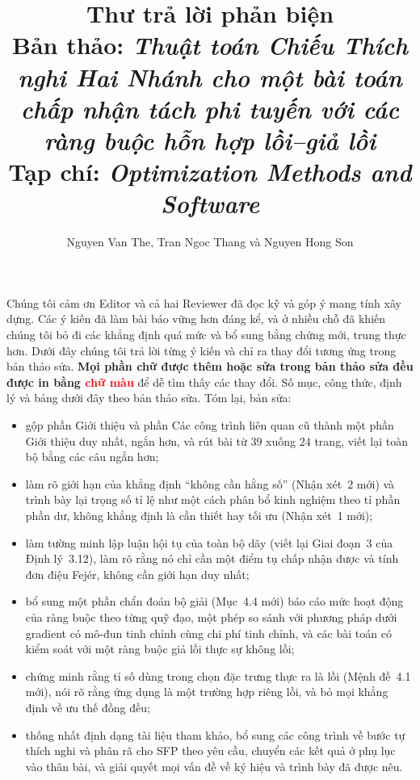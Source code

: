 \documentclass[11pt]{article}
\title{\vspace{-2em}Thư trả lời phản biện\\[0.3em]
\large Bản thảo: \emph{Thuật toán Chiếu Thích nghi Hai Nhánh cho một bài toán chấp nhận tách phi tuyến với các ràng buộc hỗn hợp lồi--giả lồi}\\[0.2em]
\normalsize Tạp chí: \emph{Optimization Methods and Software}}
\author{Nguyen Van The, Tran Ngoc Thang và Nguyen Hong Son}
\date{}
\begin{document}
\maketitle
\vspace{-2em}

\begin{center}
\end{center}

\noindent Chúng tôi cảm ơn Editor và cả hai Reviewer đã đọc kỹ và góp ý mang tính xây dựng.
Các ý kiến đã làm bài báo vững hơn đáng kể, và ở nhiều chỗ đã khiến
chúng tôi bỏ đi các khẳng định quá mức và bổ sung bằng chứng mới, trung thực hơn. Dưới đây chúng tôi trả lời
từng ý kiến và chỉ ra thay đổi tương ứng trong bản thảo sửa.
\textbf{Mọi phần chữ được thêm hoặc sửa trong bản thảo sửa đều được in bằng
\textcolor{red}{chữ màu}} để dễ tìm thấy các thay đổi. Số mục, công thức,
định lý và bảng dưới đây theo bản thảo sửa. Tóm lại, bản sửa:
\begin{itemize}[nosep]
  \item gộp phần Giới thiệu và phần Các công trình liên quan cũ thành một phần Giới thiệu
        duy nhất, ngắn hơn, và rút bài từ $39$ xuống $24$ trang, viết lại toàn bộ
        bằng các câu ngắn hơn;
  \item làm rõ giới hạn của khẳng định ``không cần hằng số'' (Nhận xét~2 mới) và trình bày lại trọng số tỉ lệ
        như một cách phân bổ kinh nghiệm theo tỉ phần phần dư, không khẳng định là cần thiết hay
        tối ưu (Nhận xét~1 mới);
  \item làm tường minh lập luận hội tụ của toàn bộ dãy (viết lại Giai đoạn~3 của
        Định lý~3.12), làm rõ rằng nó chỉ cần một điểm tụ chấp nhận được và
        tính đơn điệu Fej\'er, không cần giới hạn duy nhất;
  \item bổ sung một phần chẩn đoán bộ giải (Mục~4.4 mới) báo cáo mức hoạt động của ràng buộc
        theo từng quỹ đạo, một phép so sánh với phương pháp dưới gradient có mô-đun tinh chỉnh cùng chi phí tinh chỉnh, và
        các bài toán có kiểm soát với một ràng buộc giả lồi thực sự không lồi;
  \item chứng minh rằng tỉ số dùng trong chọn đặc trưng thực ra là lồi (Mệnh đề~4.1 mới),
        nói rõ rằng ứng dụng là một trường hợp riêng lồi, và bỏ mọi
        khẳng định về ưu thế đồng đều;
  \item thống nhất định dạng tài liệu tham khảo, bổ sung các công trình về bước tự thích nghi và phân rã
        cho SFP theo yêu cầu, chuyển các kết quả ở phụ lục vào thân bài, và giải quyết
        mọi vấn đề về ký hiệu và trình bày đã được nêu.
\end{itemize}
\end{document}
